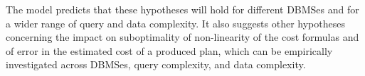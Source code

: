 The model predicts that these hypotheses will hold for different DBMSes and
for a wider range of query and data complexity. It also suggests other
hypotheses concerning the impact on suboptimality of non-linearity of the
cost formulas and of error in the estimated cost of a produced plan, which
can be empirically investigated across DBMSes, query complexity, and data
complexity.





 

